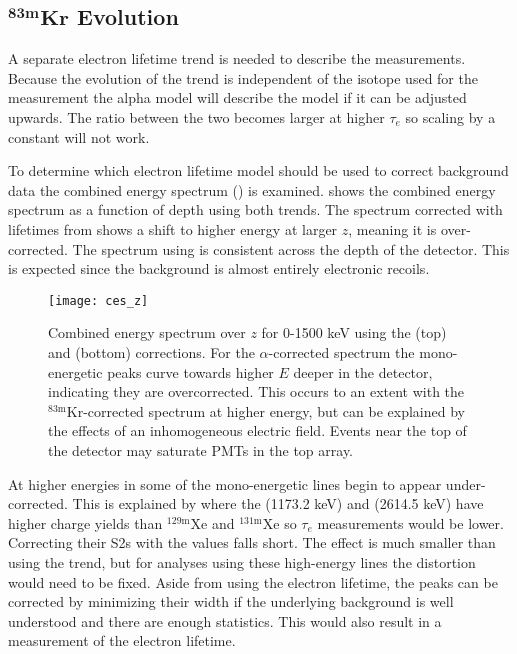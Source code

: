 \subsection[$\mathrm{^{83m}Kr}$ Evolution][$\mathrm{^{83m}Kr}$ Evolution]{$\mathbf{^{83m}Kr}$ Evolution}
\label{subsec:elifetime_fit_kr}
A separate electron lifetime trend is needed to describe the \metakr measurements.  Because the evolution of the trend is independent
of the isotope used for the measurement the alpha model will describe the \metakr model if it can be adjusted upwards.  The ratio
between the two becomes larger at higher $\tau_e$ so scaling by a constant will not work.

To determine which electron lifetime model should be used to correct background data the combined energy spectrum
() is examined.   shows the combined energy spectrum as a function
of depth using both trends.  The spectrum corrected with lifetimes from \alphadecays shows a shift to higher energy at larger $z$, meaning
it is over-corrected.  The spectrum using \metakr is consistent across the depth of the detector.  This is expected since the
background is almost entirely electronic recoils.

\begin{figure}
\centering
\texttt{[image: ces\_z]}
\caption[Combined energy spectrum over $z$ for 0-1500 keV using the \alphadecay and \metakr \stwob corrections.]{Combined energy spectrum
over $z$ for 0-1500 keV using the \alphadecay (top) and \metakr (bottom) \stwob corrections.  For the
$\alpha$-corrected spectrum the mono-energetic peaks curve towards higher $E$ deeper in the detector, indicating they are
overcorrected.  This occurs to an extent with the $\mathrm{^{83m}Kr}$-corrected spectrum at higher energy, but can be explained by the
effects of an inhomogeneous electric field.  Events near the top of the detector may saturate PMTs in the top array.}
\label{fig:elifetime_fit_kr_z_dependence}
\end{figure}

At higher energies in  some of the mono-energetic lines begin to appear under-corrected.  This
is explained by  where the  (1173.2 keV) and  (2614.5 keV)
have higher charge yields than $\mathrm{^{129m}Xe}$ and $\mathrm{^{131m}Xe}$ so $\tau_e$ measurements would be lower.  Correcting their
S2s with the \metakr values falls short.  The effect is much smaller than using the \alphadecay trend, but for analyses using these
high-energy lines the distortion would need to be fixed.  Aside from using the electron lifetime, the peaks can be corrected by minimizing
their width if the underlying background is well understood and there are enough statistics.  This would also result in a measurement of
the electron lifetime.

